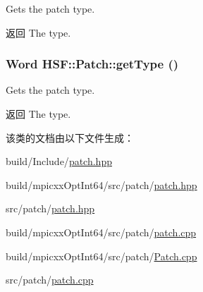 Gets the patch type. \begin{DoxyReturn}{返回}
The type. 
\end{DoxyReturn}
\hypertarget{classHSF_1_1Patch_ae4f0f1deddb67c117a07175c20854506}{
\subsubsection[{getType}]{\setlength{\rightskip}{0pt plus 5cm}Word HSF::Patch::getType ()}}
\label{classHSF_1_1Patch_ae4f0f1deddb67c117a07175c20854506}


Gets the patch type. \begin{DoxyReturn}{返回}
The type. 
\end{DoxyReturn}


该类的文档由以下文件生成：\begin{DoxyCompactItemize}
\item 
build/Include/\hyperlink{build_2Include_2patch_8hpp}{patch.hpp}\item 
build/mpicxxOptInt64/src/patch/\hyperlink{build_2mpicxxOptInt64_2src_2patch_2patch_8hpp}{patch.hpp}\item 
src/patch/\hyperlink{src_2patch_2patch_8hpp}{patch.hpp}\item 
build/mpicxxOptInt64/src/patch/\hyperlink{build_2mpicxxOptInt64_2src_2patch_2patch_8cpp}{patch.cpp}\item 
build/mpicxxOptInt64/src/patch/\hyperlink{Patch_8cpp}{Patch.cpp}\item 
src/patch/\hyperlink{src_2patch_2patch_8cpp}{patch.cpp}\end{DoxyCompactItemize}
